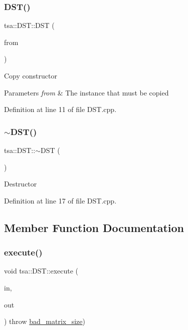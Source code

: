 \subsubsection{\texorpdfstring{D\+S\+T()}{DST()}\hspace{0.1cm}{\footnotesize\ttfamily [2/2]}}
{\footnotesize\ttfamily tsa\+::\+D\+S\+T\+::\+D\+ST (\begin{DoxyParamCaption}\item[{const \hyperlink{classtsa_1_1_d_s_t}{D\+ST} \&}]{from }\end{DoxyParamCaption})}

Copy constructor


\begin{DoxyParams}{Parameters}
{\em from} & The instance that must be copied \\
\hline
\end{DoxyParams}


Definition at line 11 of file D\+S\+T.\+cpp.

\mbox{\label{classtsa_1_1_d_s_t_a670a8bae9d3361b5a0e0be7160fee75c}} 
\subsubsection{\texorpdfstring{$\sim$\+D\+S\+T()}{~DST()}}
{\footnotesize\ttfamily tsa\+::\+D\+S\+T\+::$\sim$\+D\+ST (\begin{DoxyParamCaption}{ }\end{DoxyParamCaption})\hspace{0.3cm}{\ttfamily [virtual]}}

Destructor 

Definition at line 17 of file D\+S\+T.\+cpp.



\subsection{Member Function Documentation}
\mbox{\label{classtsa_1_1_d_s_t_a9bb56b2c2e4b7bff93d06a065903c347}} 
\subsubsection{\texorpdfstring{execute()}{execute()}\hspace{0.1cm}{\footnotesize\ttfamily [1/2]}}
{\footnotesize\ttfamily void tsa\+::\+D\+S\+T\+::execute (\begin{DoxyParamCaption}\item[{\hyperlink{namespacetsa_ad260cd21c1891c4ed391fe788569aba4}{Dmatrix} \&}]{in,  }\item[{\hyperlink{namespacetsa_ad260cd21c1891c4ed391fe788569aba4}{Dmatrix} \&}]{out }\end{DoxyParamCaption}) throw  \hyperlink{classtsa_1_1bad__matrix__size}{bad\+\_\+matrix\+\_\+size}) }

